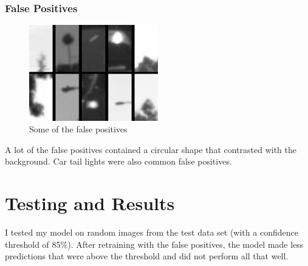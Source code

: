 \documentclass[a4paper]{article}
\begin{document}
\subsubsection{False Positives}
\begin{figure}[!htb]
\centering
\includegraphics[width=0.5\textwidth]{falsePositives.jpg}
    \caption{\label{fig:masks} Some of the false positives}
\end{figure}
A lot of the false positives contained a circular shape that contrasted with the background.  Car tail lights were also common false positives.

\section{Testing and Results}
I tested my model on random images from the test data set (with a confidence threshold of 85\%).  After retraining with the false positives, the model made less predictions that were above the threshold and did not perform all that well.
\end{document}
